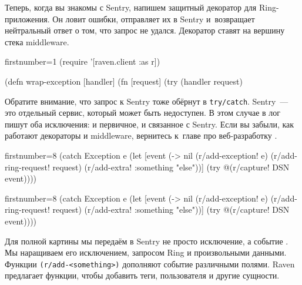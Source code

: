 
Теперь, когда вы знакомы с Sentry, напишем защитный декоратор для
Ring-приложения. Он ловит ошибки, отправляет их в Sentry и~возвращает
нейтральный ответ о том, что запрос не удался. Декоратор ставят на вершину стека
middleware.

\begin{english}
  \begin{clojure/lines*}{firstnumber=1}
(require '[raven.client :as r])

(defn wrap-exception
  [handler]
  (fn [request]
    (try
      (handler request)
  \end{clojure/lines*}
\end{english}

\wavebottom

Обратите внимание, что запрос к Sentry тоже обёрнут в \verb|try/catch|. Sentry~---
это отдельный сервис, который может быть недоступен. В этом случае в лог пишут
оба исключения: и первичное, и связанное с Sentry. Если вы забыли, как работают
декораторы и middleware, вернитесь к~главе про веб-разработку .

\wavetop

\ifx\DEVICETYPE\MOBILE

\begin{english}
  \begin{clojure/lines*}{firstnumber=8}
(catch Exception e
  (let [event
        (-> nil
            (r/add-exception! e)
            (r/add-ring-request!
              request)
            (r/add-extra!
              {:something "else"}))]
    (try @(r/capture! DSN event))))
  \end{clojure/lines*}
\end{english}

\else

\begin{english}
  \begin{clojure/lines*}{firstnumber=8}
      (catch Exception e
        (let [event (-> nil
                        (r/add-exception! e)
                        (r/add-ring-request! request)
                        (r/add-extra! {:something "else"}))]
          (try
            @(r/capture! DSN event))))
  \end{clojure/lines*}
\end{english}

\fi

\wavebottom

Для полной картины мы передаём в Sentry не просто исключение, а событие
. Мы наращиваем его исключением, запросом Ring и произвольными
данными. Функции \verb|(r/add-<something>)| дополняют событие различными
полями. Raven предлагает функции, чтобы добавить теги, пользователя и другие
сущности.

